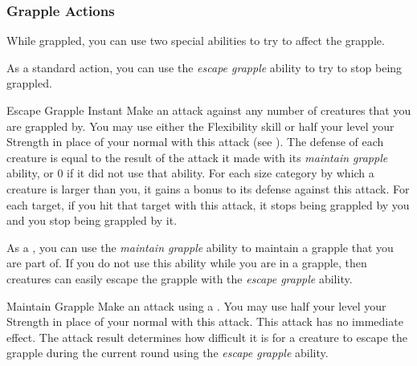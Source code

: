        \subsubsection{Grapple Actions}\label{Grapple Actions}
            While grappled, you can use two special abilities to try to affect the grapple.

             As a standard action, you can use the \textit{escape grapple} ability to try to stop being grappled.

            \begin{instantability}{Escape Grapple}
                \label{Escape Grapple}
                Instant
                \rankline
                Make an attack against any number of creatures that you are grappled by.
                You may use either the Flexibility skill or half your level \add your Strength in place of your normal  with this attack (see ).
                The defense of each creature is equal to the result of the attack it made with its \textit{maintain grapple} ability, or 0 if it did not use that ability.
                For each size category by which a creature is larger than you, it gains a  bonus to its defense against this attack.
                For each target, if you hit that target with this attack, it stops being grappled by you and you stop being grappled by it.
            \end{instantability}

             As a , you can use the \textit{maintain grapple} ability to maintain a grapple that you are part of.
            If you do not use this ability while you are in a grapple, then creatures can easily escape the grapple with the \textit{escape grapple} ability.
            \begin{instantability}{Maintain Grapple}
                \rankline
                Make an attack using a .
                You may use half your level \add your Strength in place of your normal  with this attack.
                This attack has no immediate effect.
                The attack result determines how difficult it is for a creature to escape the grapple during the current round using the \textit{escape grapple} ability.
            \end{instantability}

